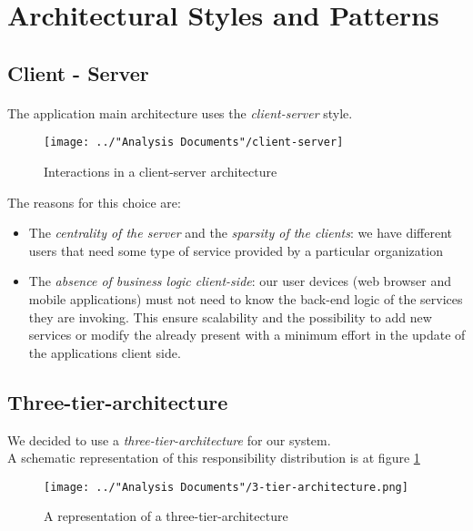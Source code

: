 \section{Architectural Styles and Patterns}

\subsection{Client - Server}
\paragraph{}The application main architecture uses the \textit{client-server} style.
\begin{figure}[H]
	\centering
	\texttt{[image: ../"Analysis Documents"/client-server]}
	\caption{Interactions in a client-server architecture}
\end{figure}
The reasons for this choice are:
\begin{itemize}
	\item The \textit{centrality of the server} and the \textit{sparsity of the clients}: we have different users that need some type of service provided by a particular organization
	\item The \textit{absence of business logic client-side}: our user devices (web browser and mobile applications) must not need to know the back-end logic of the services they are invoking. This ensure scalability and the possibility to add new services or modify the already present with a minimum effort in the update of the applications client side.
\end{itemize}

\subsection{Three-tier-architecture}
We decided to use a \textit{three-tier-architecture} for our system.\\
A schematic representation of this responsibility distribution is at figure \ref{fig:3-tier-architecture}

\begin{figure}[H]
	\centering
	\texttt{[image: ../"Analysis Documents"/3-tier-architecture.png]}
	\caption{A representation of a three-tier-architecture}
	\label{fig:3-tier-architecture}
\end{figure}
